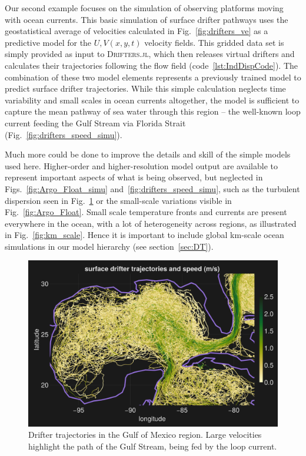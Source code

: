 \documentclass{juliacon}[12pt]
\newcommand{\pkg}[1]{{\small \textsc{#1}}}
\begin{document}
Our second example focuses on the simulation of observing platforms moving with ocean currents. This basic simulation of surface drifter pathways uses the geostatistical average of velocities calculated in Fig.~\ref{fig:drifters_ve} as a predictive model for the $U,V(x,y,t)$ velocity fields. This gridded data set is simply provided as input to \pkg{Drifters.jl}, which then releases virtual drifters and calculates their trajectories following the flow field (code~\ref{lst:IndDispCode}). The combination of these two model elements represents a previously trained model to predict surface drifter trajectories. While this simple calculation neglects time variability and small scales in ocean currents altogether, the model is sufficient to capture the mean pathway of sea water through this region -- the well-known loop current feeding the Gulf Stream via Florida Strait (Fig.~\ref{fig:drifters_speed_simu}).

Much more could be done to improve the details and skill of the simple models used here. Higher-order and higher-resolution model output are available to represent important aspects of what is being observed, but neglected in Figs.~\ref{fig:Argo_Float_simu} and~\ref{fig:drifters_speed_simu}, such as the turbulent dispersion seen in Fig.~\ref{fig:drifters_speed} or the small-scale variations visible in Fig.~\ref{fig:Argo_Float}. Small scale temperature fronts and currents are present everywhere in the ocean, with a lot of heterogeneity across regions, as illustrated in Fig.~\ref{fig:km_scale}. Hence it is important to include global km-scale ocean simulations in our model hierarchy (see section~\ref{sec:DT}). 

\begin{figure}[t]
\centerline{\includegraphics[width=\columnwidth]{figs/20240528_speed_subset.png}}
\caption{Drifter trajectories in the Gulf of Mexico region. Large velocities highlight the path of the Gulf Stream, being fed by the loop current.}
\label{fig:drifters_speed}
\end{figure}
\end{document}
